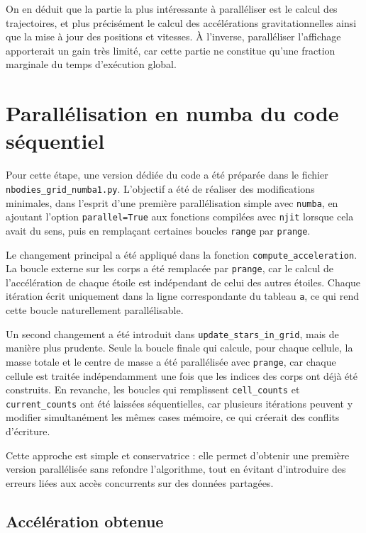 \documentclass[11pt,a4paper]{article}
\begin{document}
On en déduit que la partie la plus intéressante à paralléliser est le calcul des trajectoires, et plus précisément le calcul des accélérations gravitationnelles ainsi que la mise à jour des positions et vitesses. À l'inverse, paralléliser l'affichage apporterait un gain très limité, car cette partie ne constitue qu'une fraction marginale du temps d'exécution global.

\section{Parallélisation en numba du code séquentiel}

Pour cette étape, une version dédiée du code a été préparée dans le fichier \texttt{nbodies\_grid\_numba1.py}. L'objectif a été de réaliser des modifications minimales, dans l'esprit d'une première parallélisation simple avec \texttt{numba}, en ajoutant l'option \texttt{parallel=True} aux fonctions compilées avec \texttt{njit} lorsque cela avait du sens, puis en remplaçant certaines boucles \texttt{range} par \texttt{prange}.

Le changement principal a été appliqué dans la fonction \texttt{compute\_acceleration}. La boucle externe sur les corps a été remplacée par \texttt{prange}, car le calcul de l'accélération de chaque étoile est indépendant de celui des autres étoiles. Chaque itération écrit uniquement dans la ligne correspondante du tableau \texttt{a}, ce qui rend cette boucle naturellement parallélisable.

Un second changement a été introduit dans \texttt{update\_stars\_in\_grid}, mais de manière plus prudente. Seule la boucle finale qui calcule, pour chaque cellule, la masse totale et le centre de masse a été parallélisée avec \texttt{prange}, car chaque cellule est traitée indépendamment une fois que les indices des corps ont déjà été construits. En revanche, les boucles qui remplissent \texttt{cell\_counts} et \texttt{current\_counts} ont été laissées séquentielles, car plusieurs itérations peuvent y modifier simultanément les mêmes cases mémoire, ce qui créerait des conflits d'écriture.

Cette approche est simple et conservatrice : elle permet d'obtenir une première version parallélisée sans refondre l'algorithme, tout en évitant d'introduire des erreurs liées aux accès concurrents sur des données partagées.

\subsection{Accélération obtenue}
\end{document}

